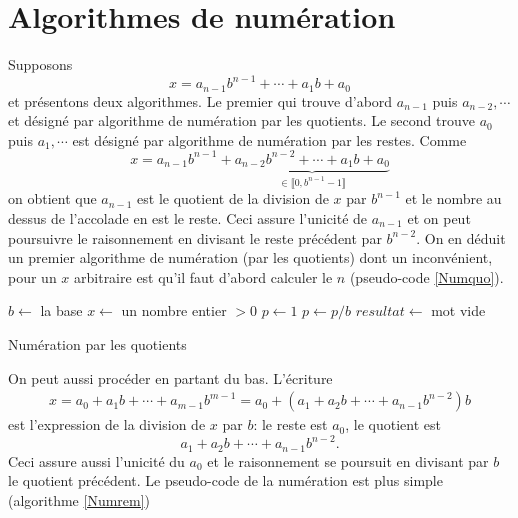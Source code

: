 \section{Algorithmes de numération}
Supposons
\begin{displaymath}
 x = a_{n-1}b^{n-1} + \cdots +  a_1 b + a_0
\end{displaymath}
et présentons deux algorithmes. Le premier qui trouve d'abord $a_{n-1}$ puis $a_{n-2}, \cdots$ et désigné par \og algorithme de numération par les quotients\fg. Le second trouve $a_0$ puis $a_1, \cdots$ est désigné par \og algorithme de numération par les restes\fg.\newline
Comme 
\begin{displaymath}
 x = a_{n-1}b^{n-1} + \underset{\in \llbracket 0 ,b^{n-1}-1\rrbracket}{\underbrace{a_{n-2}b^{n-2}  + \cdots + a_1 b + a_0}}
\end{displaymath}
on obtient que $a_{n-1}$ est le quotient de la division de $x$ par $b^{n-1}$ et le nombre au dessus de l'accolade en est le reste. Ceci assure l'unicité de $a_{n-1}$ et on peut poursuivre le raisonnement en divisant le reste précédent par $b^{n-2}$. On en déduit un premier algorithme de numération (\og par les quotients\fg) dont un inconvénient, pour un $x$ arbitraire est qu'il faut d'abord calculer le $n$ (pseudo-code \ref{Numquo}).
\begin{algorithm}
 $b \leftarrow $ la base \;
 $x \leftarrow $ un nombre entier $>0$ \;
 $p \leftarrow 1$\;
 $p \leftarrow p / b$\;
 $resultat \leftarrow$ mot vide \;
 \;
 \caption{Numération par les quotients}
 \label{Numquo}
\end{algorithm}


On peut aussi procéder en partant du bas. L'écriture
\begin{align*}
 x= a_0 + a_1 b +\cdots +a_{m-1}b^{m-1} = a_0 +(a_1+a_2b+\cdots+a_{n-1}b^{n-2})b
\end{align*}
est l'expression de la division de $x$ par $b$: le reste est $a_0$, le quotient est 
\begin{displaymath}
a_1+a_2b+\cdots+a_{n-1}b^{n-2}. 
\end{displaymath}
Ceci assure aussi l'unicité du $a_0$ et le raisonnement se poursuit en divisant par $b$ le quotient précédent. Le pseudo-code de la numération est plus simple (algorithme \ref{Numrem})

